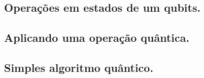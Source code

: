 \subsection{Operações em estados de um qubits.}

\subsection*{Aplicando uma operação quântica.}

\subsection{Simples algoritmo quântico.}


